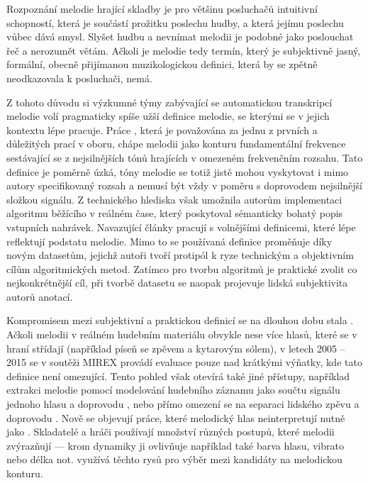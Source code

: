 Rozpoznání melodie hrající skladby je pro většinu posluchačů intuitivní schopností, která je součástí prožitku poslechu hudby, a která jejímu poslechu vůbec dává smysl. Slyšet hudbu a nevnímat melodii je podobné jako poslouchat řeč a nerozumět větám. Ačkoli je melodie tedy termín, který je subjektivně jasný, formální, obecně přijímanou muzikologickou definici, která by se zpětně neodkazovala k posluchači, nemá. 

Z tohoto důvodu si výzkumné týmy zabývající se automatickou transkripcí melodie volí pragmaticky spíše užší definice melodie, se kterými se v jejich kontextu lépe pracuje. Práce \cite{Goto1999}, která je považována za jednu z prvních a důležitých prací v oboru, chápe melodii jako konturu fundamentální frekvence sestávající se z nejsilnějších tónů hrajících v omezeném frekvenčním rozsahu. Tato definice je poměrně úzká, tóny melodie se totiž jistě mohou vyskytovat i mimo autory specifikovaný rozsah a nemusí být vždy v poměru s doprovodem nejsilnější složkou signálu. Z technického hlediska však umožnila autorům implementaci algoritmu běžícího v reálném čase, který poskytoval sémanticky bohatý popis vstupních nahrávek. Navazující články pracují s volnějšími definicemi, které lépe reflektují podstatu melodie. Mimo to se používaná definice proměňuje díky novým datasetům, jejichž autoři tvoří protipól k ryze technickým a objektivním cílům algoritmických metod. Zatímco pro tvorbu algoritmů je praktické zvolit co nejkonkrétnější cíl, při tvorbě datasetu se naopak projevuje lidská subjektivita autorů anotací. 

Kompromisem mezi subjektivní a praktickou definicí se na dlouhou dobu stala . Ačkoli melodii v reálném hudebním materiálu obvykle nese více hlasů, které se v hraní střídají (například píseň se zpěvem a kytarovým sólem), v letech 2005 -- 2015 se v soutěži MIREX provádí evaluace pouze nad krátkými výňatky, kde tato definice není omezující. Tento pohled však otevírá také jiné přístupy, například extrakci melodie pomocí modelování hudebního záznamu jako součtu signálu jednoho hlasu a doprovodu \citep{Durrieu2010}, \citep{Bosch2016b} nebo přímo omezení se na separaci lidského zpěvu a doprovodu \citep{Ikemiya2016}. Nově se objevují práce, které  melodický hlas neinterpretují nutně jako . Skladatelé a hráči používají množství různých postupů, které melodii zvýrazňují --- krom dynamiky ji ovlivňuje například také barva hlasu, vibrato nebo délka not. \cite{Salamon2012a} využívá těchto rysů pro výběr mezi kandidáty na melodickou konturu.

